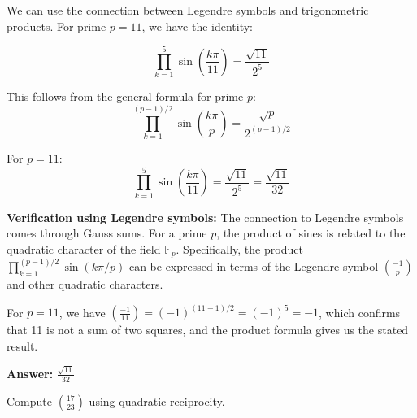 \documentclass[12pt]{article}
\newenvironment{problem}[1]
{\begin{tcolorbox}[colback=blue!5!white,colframe=blue!75!black,title={#1}]}{\end{tcolorbox}}
\newenvironment{solution}
{\begin{tcolorbox}[colback=green!5!white,colframe=green!75!black,title={Solution}]}{\end{tcolorbox}}
\begin{document}
\begin{solution}
We can use the connection between Legendre symbols and trigonometric products. For prime $p = 11$, we have the identity:

\[
\prod_{k=1}^{5} \sin\left(\frac{k\pi}{11}\right) = \frac{\sqrt{11}}{2^5}
\]

This follows from the general formula for prime $p$:
\[
\prod_{k=1}^{(p-1)/2} \sin\left(\frac{k\pi}{p}\right) = \frac{\sqrt{p}}{2^{(p-1)/2}}
\]

For $p = 11$:
\[
\prod_{k=1}^{5} \sin\left(\frac{k\pi}{11}\right) = \frac{\sqrt{11}}{2^5} = \frac{\sqrt{11}}{32}
\]

\textbf{Verification using Legendre symbols:} The connection to Legendre symbols comes through Gauss sums. For a prime $p$, the product of sines is related to the quadratic character of the field $\mathbb{F}_p$. Specifically, the product $\prod_{k=1}^{(p-1)/2} \sin(k\pi/p)$ can be expressed in terms of the Legendre symbol $\left(\frac{-1}{p}\right)$ and other quadratic characters.

For $p = 11$, we have $\left(\frac{-1}{11}\right) = (-1)^{(11-1)/2} = (-1)^5 = -1$, which confirms that 11 is not a sum of two squares, and the product formula gives us the stated result.

\textbf{Answer:} $\frac{\sqrt{11}}{32}$
\end{solution}

\begin{problem}{Example: Legendre Symbol Calculation}
Compute $\left(\frac{17}{23}\right)$ using quadratic reciprocity.
\end{problem}
\end{document}
